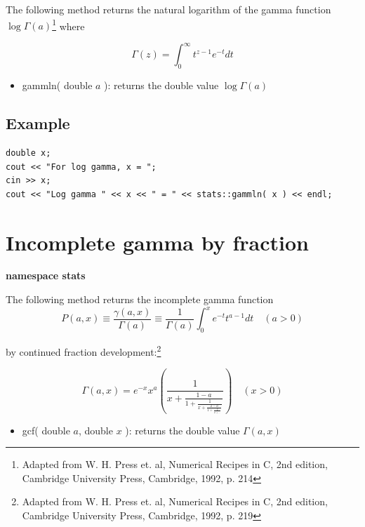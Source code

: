 \documentclass{report}
\begin{document}
The following method returns the natural logarithm of the gamma
function $\log \Gamma(a)$\footnote{Adapted from W. H. Press et. al,
Numerical Recipes in C, 2nd edition, Cambridge University Press,
Cambridge, 1992, p. 214} where 

\begin{equation}
\Gamma(z) = \int_0^\infty t^{z-1}e^{-t}dt
\end{equation}

\begin{itemize}
\item gammln( double $a$ ): returns the double value $\log \Gamma(a)$
\end{itemize}

\subsection{Example}
\begin{verbatim}
double x;
cout << "For log gamma, x = ";
cin >> x;
cout << "Log gamma " << x << " = " << stats::gammln( x ) << endl;
\end{verbatim}

\section{Incomplete gamma by fraction}

{\bf namespace stats}

The following method returns the incomplete gamma function
\begin{equation}\label{incmpgammfx}
P(a,x) \equiv \frac{\gamma(a,x)}{\Gamma(a)}
\equiv \frac{1}{\Gamma(a)}\int_0^x e^{-t}t^{a-1}dt \quad (a>0)
\end{equation}

by continued fraction development:\footnote{Adapted from W. H. Press
et. al, Numerical Recipes in C, 2nd edition, Cambridge University
Press, Cambridge, 1992, p. 219} 

\begin{equation}
\Gamma(a,x) = e^{-x}x^a\left(\frac{1}{x+\frac{1-a}{1+\frac{1}{x+
\frac{2-a}{1+\frac{2}{x+\cdots}}}}}\right) \quad (x>0)
\end{equation}

\begin{itemize}
\item gcf( double $a$, double $x$ ): returns the double value
$\Gamma(a,x)$
\end{itemize}
\end{document}
